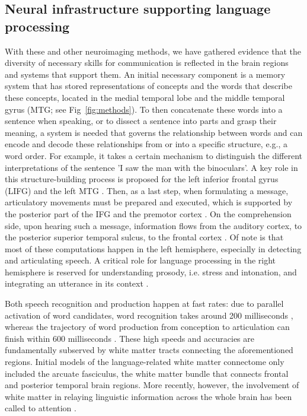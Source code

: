 \subsection*{Neural infrastructure supporting language processing} 

With these and other neuroimaging methods, we have gathered evidence that the diversity of necessary skills for communication is reflected in the brain regions and systems that support them. An initial necessary component is a memory system that has stored representations of concepts and the words that describe these concepts, located in the medial temporal lobe and the middle temporal gyrus (MTG; see Fig~\ref{fig:methods}). To then concatenate these words into a sentence when speaking, or to dissect a sentence into parts and grasp their meaning, a system is needed that governs the relationship between words and can encode and decode these relationships from or into a specific structure, e.g., a word order. For example, it takes a certain mechanism to distinguish the different interpretations of the sentence 'I saw the man with the binoculars'. A key role in this structure-building process is proposed for the left inferior frontal gyrus (LIFG) and the left MTG \citep{giglio2022,hagoort2017}. Then, as a last step, when formulating a message, articulatory movements must be prepared and executed, which is supported by the posterior part of the IFG and the premotor cortex \citep[PM; ][]{hickok2007}. On the comprehension side, upon hearing such a message, information flows from the auditory cortex, to the posterior superior temporal sulcus, to the frontal cortex \citep{friederici2012}. Of note is that most of these computations happen in the left hemisphere, especially in detecting and articulating speech. A critical role for language processing in the right hemisphere is reserved for understanding prosody, i.e. stress and intonation, and integrating an utterance in its context \citep{beaucousin2006,vigneau2011}. 


Both speech recognition and production happen at fast rates: due to parallel activation of word candidates, word recognition takes around 200 milliseconds \citep{mcclelland1986}, whereas the trajectory of word production from conception to articulation can finish within 600 milliseconds \citep{indefrey2004}. These high speeds and accuracies are fundamentally subserved by white matter tracts connecting the aforementioned regions. Initial models of the language-related white matter connectome only included the arcuate fasciculus, the white matter bundle that connects frontal and posterior temporal brain regions. More recently, however, the involvement of white matter in relaying linguistic information across the whole brain has been called to attention \citep{przezdzik2019,tyler2007}.  


